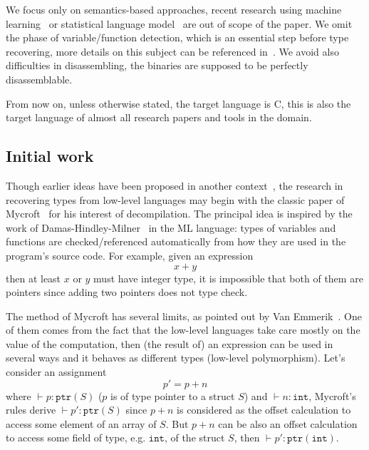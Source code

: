 \documentclass[compsoc,conference,a4paper,10pt,times]{IEEEtran}
\begin{document}
We focus only on semantics-based approaches, recent research using machine learning~\cite{maier_typeminer_2019}
or statistical language model~\cite{katz_estimating_2016} are out of scope of the paper.
We omit the phase of variable/function detection, which is an essential step before
type recovering, more details on this subject can be referenced in~\cite{balakrishnan_divine_2007}.
We avoid also difficulties in disassembling, the binaries are supposed to be perfectly disassemblable.

From now on, unless otherwise stated, the target language is C, this is also the target language of almost all
research papers and tools in the domain.

\subsection{Initial work}
\noindent
Though earlier ideas have been proposed in another context~\cite{shivers_data-flow_1990},
the research in recovering types from low-level languages may begin with the classic paper of
Mycroft~\cite{mycroft_type-based_1999} for his interest of decompilation. The principal idea is
inspired by the work of Damas-Hindley-Milner~\cite{milner_theory_1978,damas_principal_1982} in
the ML language: types of variables and functions are checked/referenced automatically
from how they are used in the program's source code. For example, given an expression
\begin{equation*}
  x + y
\end{equation*}
then at least $x$ or $y$ must have integer type, it is impossible that both of them are pointers
since adding two pointers does not type check.

The method of Mycroft has several limits, as pointed out by Van Emmerik~\cite{van_emmerik_static_2007}.
One of them comes from the fact that the low-level languages take care mostly on the value of
the computation, then (the result of) an expression can be used in several ways and it behaves as
different types (low-level polymorphism). Let's consider an assignment
\begin{equation*}
  p' = p + n
\end{equation*}
where $\vdash p \colon \mathtt{ptr}(S)$ ($p$ is of type pointer to a struct $S$) and
$\vdash n \colon \mathtt{int}$, Mycroft's
rules derive $\vdash p' \colon \mathtt{ptr}(S)$ since $p + n$ is considered as the offset calculation to
access some element of an array of $S$. But $p + n$ can be also an
offset calculation to access some field of type, e.g. $\mathtt{int}$, of the struct $S$,
then $\vdash p' \colon \mathtt{ptr}(\mathtt{int})$.
\end{document}
